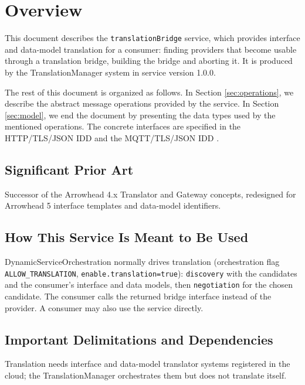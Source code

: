 \documentclass[a4paper]{arrowhead}
\begin{document}
\section{Overview}
\label{sec:overview}

This document describes the \texttt{translationBridge} service, which provides interface and data-model translation for a consumer: finding providers that become usable through a translation bridge, building the bridge and aborting it.
It is produced by the TranslationManager system \cite{tm-sysd} in service version 1.0.0.

The rest of this document is organized as follows.
In Section \ref{sec:operations}, we describe the abstract message operations provided by the service.
In Section \ref{sec:model}, we end the document by presenting the data types used by the mentioned operations.
The concrete interfaces are specified in the HTTP/TLS/JSON IDD \cite{tm-translationBridge-http-idd} and the MQTT/TLS/JSON IDD \cite{tm-translationBridge-mqtt-idd}.

\subsection{Significant Prior Art}

Successor of the Arrowhead 4.x Translator and Gateway concepts, redesigned for Arrowhead 5 interface templates and data-model identifiers.

\subsection{How This Service Is Meant to Be Used}

Dynamic\allowbreak{}Service\allowbreak{}Orchestration normally drives translation (orchestration flag \texttt{ALLOW\_\allowbreak{}TRANSLATION}, \texttt{enable.\allowbreak{}translation=\allowbreak{}true}): \texttt{discovery} with the candidates and the consumer's interface and data models, then \texttt{negotiation} for the chosen candidate. The consumer calls the returned bridge interface instead of the provider. A consumer may also use the service directly.

\subsection{Important Delimitations and Dependencies}
\label{sec:delimitations}

Translation needs interface and data-model translator systems registered in the cloud; the Translation\allowbreak{}Manager orchestrates them but does not translate itself.
\end{document}
